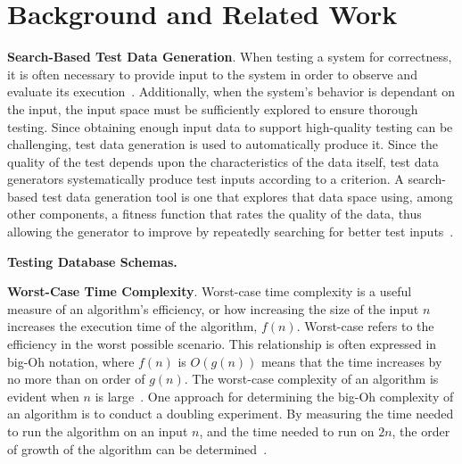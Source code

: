 
\section{Background and Related Work}



{\bf Search-Based Test Data Generation}. When testing a system for correctness, it is often necessary to provide input
to the system in order to observe and evaluate its execution~\cite{ammann2008}. Additionally, when the system's behavior
is dependant on the input, the input space must be sufficiently explored to ensure thorough testing.  Since obtaining
enough input data to support high-quality testing can be challenging, test data generation is used to automatically
produce it. Since the quality of the test depends upon the characteristics of the data itself, test data generators
systematically produce test inputs according to a criterion. A search-based test data generation tool is one that
explores that data space using, among other components, a fitness function that rates the quality of the data, thus
allowing the generator to improve by repeatedly searching for better test inputs~\cite{mcminn2004a}.


{\bf Testing Database Schemas.} 


{\bf Worst-Case Time Complexity}. Worst-case time complexity is a useful measure of an algorithm's efficiency, or how
increasing the size of the input $n$ increases the execution time of the algorithm, $f(n)$.  Worst-case refers to the
efficiency in the worst possible scenario.  This relationship is often expressed in big-Oh notation, where $f(n)$ is
$O(g(n))$ means that the time increases by no more than on order of $g(n)$. The worst-case complexity of an algorithm is
evident when $n$ is large~\cite{Goodrich2014}. One approach for determining the big-Oh complexity of an algorithm is to
conduct a doubling experiment. By measuring the time needed to run the algorithm on an input $n$, and the time needed to
run on $2n$, the order of growth of the algorithm can be determined~\cite{McGeoch2012,Sedgewick1998}.

